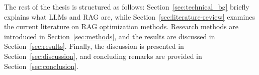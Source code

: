 The rest of the thesis is structured as follows: Section~\ref{sec:technical_bg} briefly explains what LLMs and RAG are, while Section~\ref{sec:literature-review} examines the current literature on RAG optimization methods. Research methods are introduced in Section~\ref{sec:methods}, and the results are discussed in Section~\ref{sec:results}. Finally, the discussion is presented in Section~\ref{sec:discussion}, and concluding remarks are provided in Section~\ref{sec:conclusion}.


